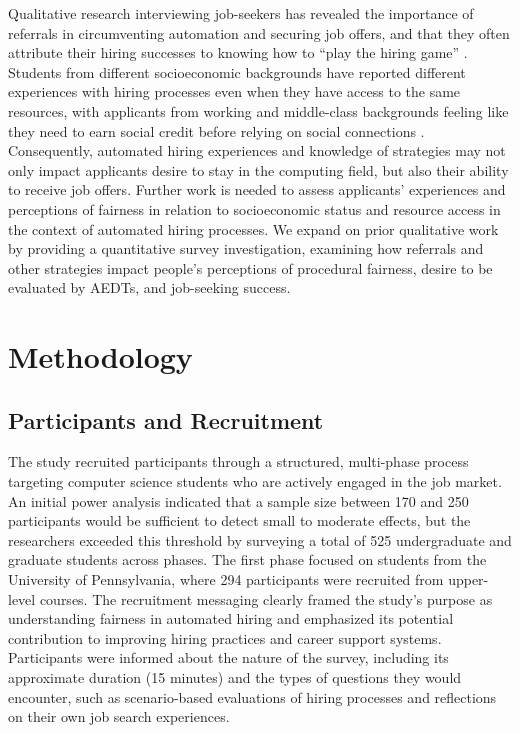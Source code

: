 Qualitative research interviewing job-seekers has revealed the importance of referrals in circumventing automation and securing job offers, and that they often attribute their hiring successes to knowing how to “play the hiring game” \cite{4_armstrong2023navigating,16_agyare2026why}. Students from different socioeconomic backgrounds have reported different experiences with hiring processes even when they have access to the same resources, with applicants from working and middle-class backgrounds feeling like they need to earn social credit before relying on social connections \cite{16_agyare2026why}. Consequently, automated hiring experiences and knowledge of strategies may not only impact applicants desire to stay in the computing field, but also their ability to receive job offers. Further work is needed to assess applicants' experiences and perceptions of fairness in relation to socioeconomic status and resource access in the context of automated hiring processes. We expand on prior qualitative work by providing a quantitative survey investigation, examining how referrals and other strategies impact people's perceptions of procedural fairness, desire to be evaluated by AEDTs, and job-seeking success.

\section{Methodology}
\subsection{Participants and Recruitment}
The study recruited participants through a structured, multi-phase process targeting computer science students who are actively engaged in the job market. An initial power analysis indicated that a sample size between 170 and 250 participants would be sufficient to detect small to moderate effects, but the researchers exceeded this threshold by surveying a total of 525 undergraduate and graduate students across phases. The first phase focused on students from the University of Pennsylvania, where 294 participants were recruited from upper-level courses. The recruitment messaging clearly framed the study’s purpose as understanding fairness in automated hiring and emphasized its potential contribution to improving hiring practices and career support systems. Participants were informed about the nature of the survey, including its approximate duration (15 minutes) and the types of questions they would encounter, such as scenario-based evaluations of hiring processes and reflections on their own job search experiences.

